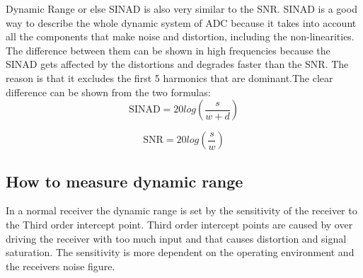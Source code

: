 Dynamic Range or else \gls{SINAD} is also very similar to the \gls{SNR}. \gls{SINAD} is a good way to describe the whole dynamic system of \gls{ADC} because it takes into account all the components that make noise and distortion, including the non-linearities. %
The difference between them can be shown in high frequencies because the \gls{SINAD} gets affected by the distortions and degrades faster than the \gls{SNR}. The reason is that it excludes the first 5 harmonics that are dominant.The clear difference can be shown from the two formulas\citep{SINADandSNR}:
\begin{equation}
\text{SINAD} = 20log\left(\frac{s}{w+d}\right)
\end{equation}

\begin{equation}
\text{SNR} = 20log\left(\frac{s}{w}\right)
\end{equation}

\begin{where}
\end{where}

\subsection{How to measure dynamic range}

In a normal receiver the dynamic range is set by the sensitivity of the receiver to the Third order intercept point. Third order intercept points are caused by over driving the receiver with too much input and that causes distortion and signal saturation. The sensitivity is more dependent on the operating environment and the receivers noise figure. \citep{understandDynamic}


